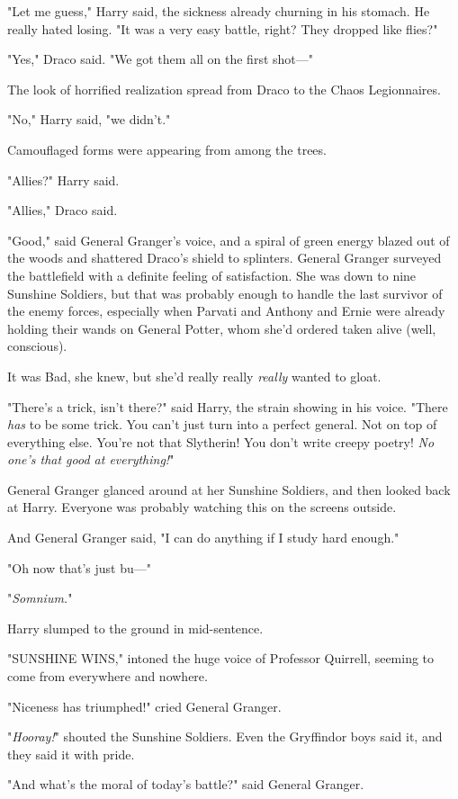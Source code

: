 "Let me guess," Harry said, the sickness already churning in his stomach. He
really hated losing. "It was a very easy battle, right? They dropped like
flies?"

"Yes," Draco said. "We got them all on the first shot---"

The look of horrified realization spread from Draco to the Chaos Legionnaires.

"No," Harry said, "we didn't."

Camouflaged forms were appearing from among the trees.

"Allies?" Harry said.

"Allies," Draco said.

"Good," said General Granger's voice, and a spiral of green energy blazed out
of the woods and shattered Draco's shield to splinters.
\sbreak
General Granger surveyed the battlefield with a definite feeling of
satisfaction. She was down to nine Sunshine Soldiers, but that was probably
enough to handle the last survivor of the enemy forces, especially when Parvati
and Anthony and Ernie were already holding their wands on General Potter, whom
she'd ordered taken alive (well, conscious).

It was Bad, she knew, but she'd really really \emph{really} wanted to gloat.

"There's a trick, isn't there?" said Harry, the strain showing in his voice.
"There \emph{has} to be some trick. You can't just turn into a perfect general.
Not on top of everything else. You're not that Slytherin! You don't write
creepy poetry! \emph{No one's that good at everything!}"

General Granger glanced around at her Sunshine Soldiers, and then looked back
at Harry. Everyone was probably watching this on the screens outside.

And General Granger said, "I can do anything if I study hard enough."

"Oh now that's just bu---"

"\emph{Somnium.}"

Harry slumped to the ground in mid-sentence.

"SUNSHINE WINS," intoned the huge voice of Professor Quirrell, seeming to come
from everywhere and nowhere.

"Niceness has triumphed!" cried General Granger.

"\emph{Hooray!}" shouted the Sunshine Soldiers. Even the Gryffindor boys said
it, and they said it with pride.

"And what's the moral of today's battle?" said General Granger.

